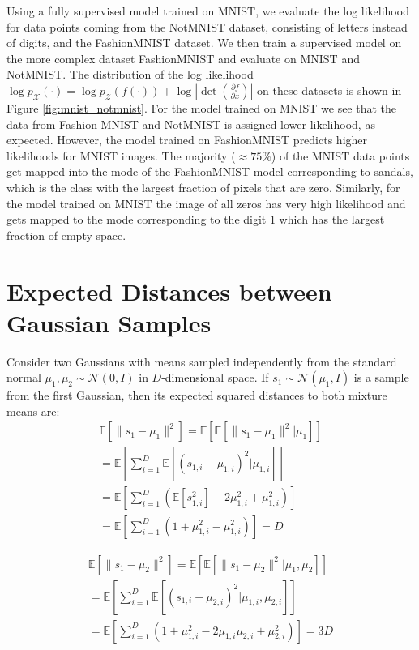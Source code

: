 \documentclass{article}
\newcommand{\mX}{\mathcal{X}}
\newcommand{\mZ}{\mathcal{Z}}
\newcommand{\mN}{\mathcal{N}}
\begin{document}
Using a fully supervised model trained on MNIST, we evaluate the log likelihood for data points coming from the NotMNIST dataset, consisting of letters instead of digits, and the FashionMNIST dataset. We then train a supervised model on the more complex dataset FashionMNIST and evaluate on MNIST and NotMNIST.
The distribution of the log likelihood $\log p_\mX(\cdot) = \log p_\mZ(f(\cdot)) + \log \left| \det \left( \frac {\partial f}{\partial x} \right) \right|$ on these datasets is shown in Figure \ref{fig:mnist_notmnist}. For the model trained on MNIST we see that the data
from Fashion MNIST and NotMNIST is assigned lower
likelihood, as expected.
However, the model trained on FashionMNIST predicts higher likelihoods for MNIST images. The majority ($\approx 75\%$) of the MNIST data points get mapped into the mode of the FashionMNIST model corresponding to sandals, which is the class with the largest fraction of pixels that are zero. 
Similarly, for the model trained on MNIST the image 
of all zeros has very high likelihood and gets mapped to the mode corresponding to the digit $1$ which has 
the largest fraction of empty space.


\section{Expected Distances between Gaussian Samples}
\label{sec:calibration_derivation}

Consider two Gaussians with means sampled independently from the standard normal ${\mu_1, \mu_2 \sim \mN(0, I)}$ in $D$-dimensional space.  If ${s_1 \sim \mN(\mu_1, I)}$ is a sample from the first Gaussian, then its expected squared distances to both mixture means are:
\begin{multline*}
    \mathbb{E} \left[\|s_1 - \mu_1\|^2 \right]
= \mathbb{E} \left[ \mathbb{E} \left[\|s_1 - \mu_1\|^2 | \mu_1 \right] \right]\\
= \mathbb{E} \left[ \sum_{i=1}^D \mathbb{E}\left[(s_{1, i} - \mu_{1, i})^2 | \mu_{1, i}\right] \right]\\ 
= \mathbb{E} \left[ \sum_{i=1}^D \left( \mathbb{E}[s_{1, i}^2] - 2 \mu_{1, i}^2 + \mu_{1, i}^2 \right) \right]\\
= \mathbb{E} \left[ \sum_{i=1}^D \left( 1 + \mu_{1, i}^2 - \mu_{1, i}^2 \right) \right] = D
\end{multline*}

\begin{multline*}
    \mathbb{E} \left[ \|s_1 - \mu_2\|^2 \right]
= \mathbb{E} \left[ \mathbb{E} \left[\|s_1 - \mu_2\|^2 | \mu_1, \mu_2 \right] \right] \\
= \mathbb{E} \left[ \sum_{i=1}^D \mathbb{E}\left[(s_{1, i} - \mu_{2, i})^2 | \mu_{1, i}, \mu_{2, i}\right] \right] \\
= \mathbb{E} \left[ \sum_{i=1}^D \left( 1 + \mu_{1, i}^2 - 2 \mu_{1, i}\mu_{2, i} + \mu_{2, i}^2 \right) \right] = 3D 
\end{multline*}
\end{document}
